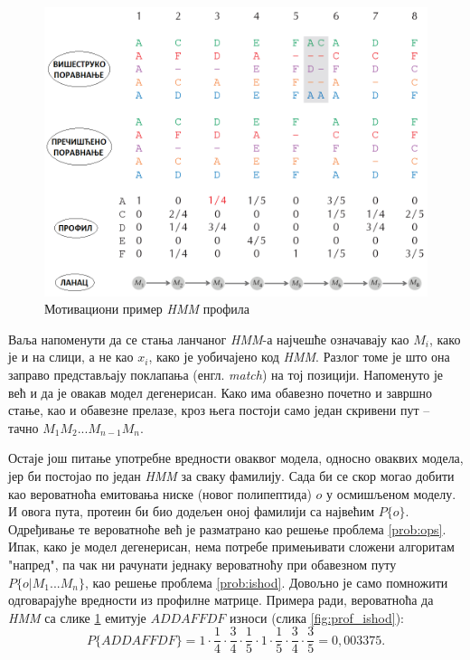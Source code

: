 \documentclass[12pt,oneside]{memoir}
\begin{document}
\begin{CJK}{UTF8}{ipxm}
\begin{figure}[H]
  \centering
  \includegraphics[width=\textwidth]{profil.png}
  \caption{Мотивациони пример \textit{HMM} профила \cite{compeau2015}}
  \label{fig:profil}
\end{figure}

Ваља напоменути да се стања ланчаног \textit{HMM}-а најчешће означавају као $M_i$, како је и на слици, а не као $x_i$, како је уобичајено код \textit{HMM}. Разлог томе је што она заправо представљају поклапања (енгл. \textit{match}) на тој позицији. Напоменуто је већ и да је овакав модел дегенерисан. Како има обавезно почетно и завршно стање, као и обавезне прелазе, кроз њега постоји само један скривени пут -- тачно $M_1M_2...M_{n-1}M_n$.

Остаје још питање употребне вредности оваквог модела, односно оваквих модела, јер би постојао по један \textit{HMM} за сваку фамилију. Сада би се скор могао добити као вероватноћа емитовања ниске (новог полипептида) $o$ у осмишљеном моделу. И овога пута, протеин би био додељен оној фамилији са највећим $P\{o\}$. Одређивање те вероватноће већ је разматрано као решење проблема \ref{prob:ops}. Ипак, како је модел дегенерисан, нема потребе примењивати сложени алгоритам "напред", па чак ни рачунати једнаку вероватноћу при обавезном путу $P\{o | M_1...M_n\}$, као решење проблема \ref{prob:ishod}. Довољно је само помножити одговарајуће вредности из профилне матрице. Примера ради, вероватноћа да \textit{HMM} са слике \ref{fig:profil} емитује $ADDAFFDF$ износи (слика \ref{fig:prof_ishod}): $$P\{ADDAFFDF\} = 1 \cdot \frac{1}{4} \cdot \frac{3}{4} \cdot \frac{1}{5} \cdot 1 \cdot \frac{1}{5} \cdot \frac{3}{4} \cdot \frac{3}{5} = 0,003375.$$


\end{CJK}
\end{document}
